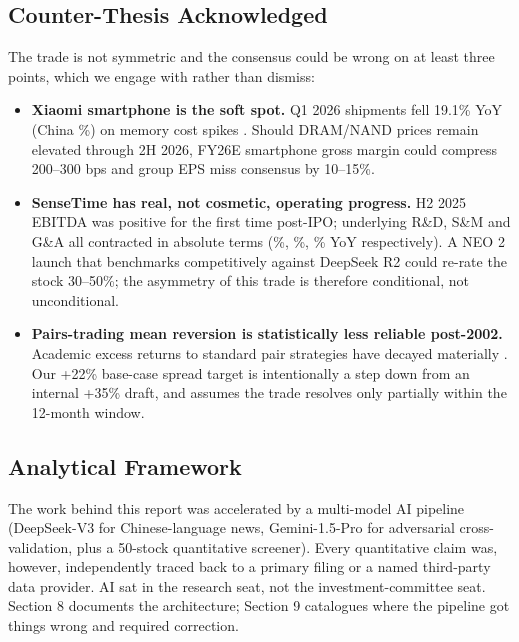 \documentclass[11pt,a4paper]{article}
\begin{document}
\subsection*{Counter-Thesis Acknowledged}

The trade is not symmetric and the consensus could be wrong on at least three points, which we engage with rather than dismiss:
\begin{itemize}
\item \textbf{Xiaomi smartphone is the soft spot.} Q1 2026 shipments fell 19.1\% YoY (China \%) on memory cost spikes \cite{idc2026q1}. Should DRAM/NAND prices remain elevated through 2H 2026, FY26E smartphone gross margin could compress 200--300 bps and group EPS miss consensus by 10--15\%.
\item \textbf{SenseTime has real, not cosmetic, operating progress.} H2 2025 EBITDA was positive for the first time post-IPO; underlying R\&D, S\&M and G\&A all contracted in absolute terms (\%, \%, \% YoY respectively). A NEO 2 launch that benchmarks competitively against DeepSeek R2 could re-rate the stock 30--50\%; the asymmetry of this trade is therefore conditional, not unconditional.
\item \textbf{Pairs-trading mean reversion is statistically less reliable post-2002.} Academic excess returns to standard pair strategies have decayed materially \cite{gatev2006pairs}. Our +22\% base-case spread target is intentionally a step down from an internal +35\% draft, and assumes the trade resolves only partially within the 12-month window.
\end{itemize}

\subsection*{Analytical Framework}
The work behind this report was accelerated by a multi-model AI pipeline (DeepSeek-V3 for Chinese-language news, Gemini-1.5-Pro for adversarial cross-validation, plus a 50-stock quantitative screener). Every quantitative claim was, however, independently traced back to a primary filing or a named third-party data provider. AI sat in the research seat, not the investment-committee seat. Section 8 documents the architecture; Section 9 catalogues where the pipeline got things wrong and required correction.

\vspace{0.3cm}
\end{document}
